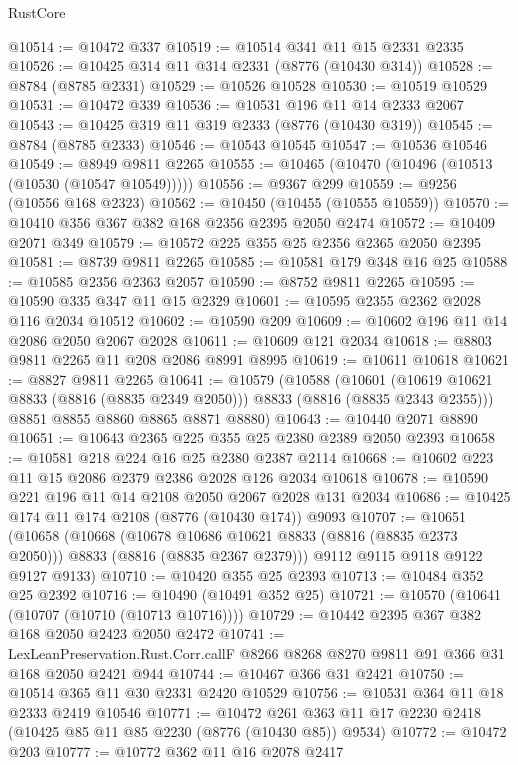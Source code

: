 \begin{lexlean}{RustCore}
\begin{coremodule}
@10514 := @10472 @337
@10519 := @10514 @341 @11 @15 @2331 @2335
@10526 := @10425 @314 @11 @314 @2331 (@8776 (@10430 @314))
@10528 := @8784 (@8785 @2331)
@10529 := @10526 @10528
@10530 := @10519 @10529
@10531 := @10472 @339
@10536 := @10531 @196 @11 @14 @2333 @2067
@10543 := @10425 @319 @11 @319 @2333 (@8776 (@10430 @319))
@10545 := @8784 (@8785 @2333)
@10546 := @10543 @10545
@10547 := @10536 @10546
@10549 := @8949 @9811 @2265
@10555 := @10465 (@10470 (@10496 (@10513 (@10530 (@10547 @10549)))))
@10556 := @9367 @299
@10559 := @9256 (@10556 @168 @2323)
@10562 := @10450 (@10455 (@10555 @10559))
@10570 := @10410 @356 @367 @382 @168 @2356 @2395 @2050 @2474
@10572 := @10409 @2071 @349
@10579 := @10572 @225 @355 @25 @2356 @2365 @2050 @2395
@10581 := @8739 @9811 @2265
@10585 := @10581 @179 @348 @16 @25
@10588 := @10585 @2356 @2363 @2057
@10590 := @8752 @9811 @2265
@10595 := @10590 @335 @347 @11 @15 @2329
@10601 := @10595 @2355 @2362 @2028 @116 @2034 @10512
@10602 := @10590 @209
@10609 := @10602 @196 @11 @14 @2086 @2050 @2067 @2028
@10611 := @10609 @121 @2034
@10618 := @8803 @9811 @2265 @11 @208 @2086 @8991 @8995
@10619 := @10611 @10618
@10621 := @8827 @9811 @2265
@10641 := @10579
    (@10588
      (@10601 (@10619 @10621 @8833 (@8816 (@8835 @2349 @2050))) @8833 (@8816 (@8835 @2343 @2355)))
      @8851
      @8855
      @8860
      @8865
      @8871
      @8880)
@10643 := @10440 @2071 @8890
@10651 := @10643 @2365 @225 @355 @25 @2380 @2389 @2050 @2393
@10658 := @10581 @218 @224 @16 @25 @2380 @2387 @2114
@10668 := @10602 @223 @11 @15 @2086 @2379 @2386 @2028 @126 @2034 @10618
@10678 := @10590 @221 @196 @11 @14 @2108 @2050 @2067 @2028 @131 @2034
@10686 := @10425 @174 @11 @174 @2108 (@8776 (@10430 @174)) @9093
@10707 := @10651
    (@10658
      (@10668
        (@10678 @10686 @10621 @8833 (@8816 (@8835 @2373 @2050)))
        @8833
        (@8816 (@8835 @2367 @2379)))
      @9112
      @9115
      @9118
      @9122
      @9127
      @9133)
@10710 := @10420 @355 @25 @2393
@10713 := @10484 @352 @25 @2392
@10716 := @10490 (@10491 @352 @25)
@10721 := @10570 (@10641 (@10707 (@10710 (@10713 @10716))))
@10729 := @10442 @2395 @367 @382 @168 @2050 @2423 @2050 @2472
@10741 := LexLeanPreservation.Rust.Corr.callF
    @8266
    @8268
    @8270
    @9811
    @91
    @366
    @31
    @168
    @2050
    @2421
    @944
@10744 := @10467 @366 @31 @2421
@10750 := @10514 @365 @11 @30 @2331 @2420 @10529
@10756 := @10531 @364 @11 @18 @2333 @2419 @10546
@10771 := @10472 @261 @363 @11 @17 @2230 @2418 (@10425 @85 @11 @85 @2230 (@8776 (@10430 @85)) @9534)
@10772 := @10472 @203
@10777 := @10772 @362 @11 @16 @2078 @2417

\end{coremodule}
\end{lexlean}
